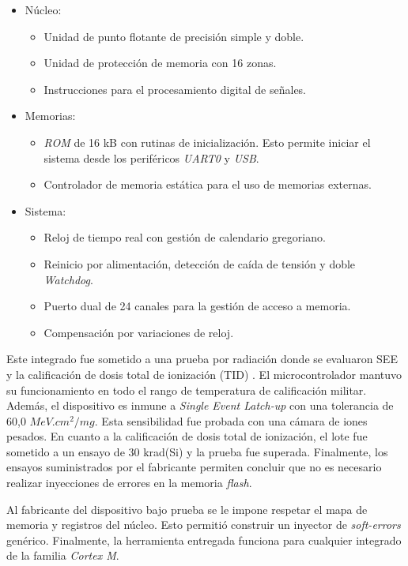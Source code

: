 \begin{itemize}
    \item Núcleo:
        \begin{itemize}
            \item Unidad de punto flotante de precisión simple y doble.
            \item Unidad de protección de memoria con 16 zonas.
            \item Instrucciones para el procesamiento digital de señales.
        \end{itemize}
    \item Memorias:
        \begin{itemize}
            \item \emph{ROM} de 16 kB con rutinas de inicialización. Esto permite iniciar el sistema desde los periféricos \emph{UART0} y \emph{USB}.
            \item Controlador de memoria estática para el uso de memorias externas.
        \end{itemize}
    \item Sistema:
        \begin{itemize}
            \item Reloj de tiempo real con gestión de calendario gregoriano.
            \item Reinicio por alimentación, detección de caída de tensión y doble \emph{Watchdog}.
            \item Puerto dual de 24 canales para la gestión de acceso a memoria.
            \item Compensación por variaciones de reloj.
        \end{itemize}
\end{itemize}

Este integrado fue sometido a una prueba por radiación donde se evaluaron SEE y la calificación de dosis total de ionización (TID) \citep{ARTICLE:dutrad}.
El microcontrolador mantuvo su funcionamiento en todo el rango de temperatura de calificación militar.
Además, el dispositivo es inmune a \emph{Single Event Latch-up} con una tolerancia de 60,0 $MeV.cm^2/mg$.
Esta sensibilidad fue probada con una cámara de iones pesados.
En cuanto a la calificación de dosis total de ionización, el lote fue sometido a un ensayo de 30 krad(Si) y la prueba fue superada.
Finalmente, los ensayos suministrados por el fabricante permiten concluir que no es necesario realizar inyecciones de errores en la memoria \emph{flash}.

Al fabricante del dispositivo bajo prueba se le impone respetar el mapa de memoria y registros del núcleo.
Esto permitió construir un inyector de \emph{soft-errors} genérico.
Finalmente, la herramienta entregada funciona para cualquier integrado de la familia \emph{Cortex M}.

